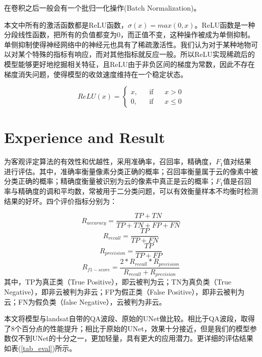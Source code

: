 \documentclass[UTF8]{ctexart}
\begin{document}
在卷积之后一般会有一个批归一化操作(Batch Normalization)。

本文中所有的激活函数都是ReLU函数，$\sigma(x)=max(0,x)$。ReLU函数是一种分段线性函数，把所有的负值都变为0，而正值不变，这种操作被成为单侧抑制。单侧抑制使得神经网络中的神经元也具有了稀疏激活性。我们认为对于某种地物可以对某个特殊的指标有响应，而对其他指标就反应一般。所以ReLU实现稀疏后的模型能够更好地挖掘相关特征，且ReLU由于非负区间的梯度为常数，因此不存在梯度消失问题，使得模型的收敛速度维持在一个稳定状态。

\begin{equation}
    ReLU(x)=\left\{
    \begin{aligned}
        x, & &\text{if} & & x > 0 \\
        0, & &\text{if} & & x \leq 0
    \end{aligned}
    \right.
\end{equation}


\section[]{Experience and Result}

为客观评定算法的有效性和优越性，采用准确率，召回率，精确度，$F_1$值对结果进行评估。其中，准确率衡量像素分类正确的概率；召回率衡量属于云的像素中被分类正确的概率；精确度衡量被识别为云的像素中真正是云的概率；$F_1$值是召回率与精确度的调和平均数，常被用于二分类问题，可以有效衡量样本不均衡时检测结果的好坏。四个评价指标分别为：

\begin{equation}
    R_{accuracy} = \frac{TP + TN}{TP + TN + FP + FN}\label{acc}
\end{equation}
\begin{equation}
    R_{recall} = \frac{TP}{TP + FN}\label{recall}
\end{equation}
\begin{equation}
    R_{precision} = \frac{TP}{TP + FP}\label{precision}
\end{equation}
\begin{equation}
    R_{f1-score} = \frac{2 * R_{recall} * R_{precision}}{R_{recall} + R_{precision}}\label{f1}
\end{equation}
其中，TP为真正类（True Positive），即云被判为云；TN为真负类（True Negative），即非云被判为非云；FP为假正类（False Positive），即非云被判为云；FN为假负类（false Negative），云被判为非云。

本文将模型与landsat自带的QA波段、原始的UNet做比较。相比于QA波段，取得了8个百分点的性能提升；相比于原始的UNet，效果十分接近，但是我们的模型参数仅不到UNet的十分之一，更加轻量，具有更大的应用潜力。更详细的评估结果如表(\ref{tab_eval})所示。
\end{document}
